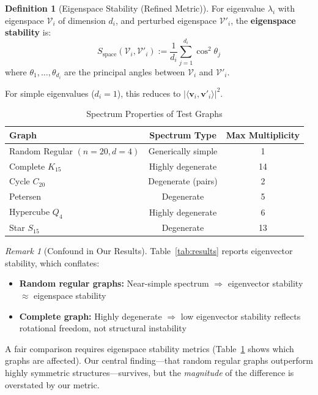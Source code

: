 \documentclass[11pt,a4paper]{article}
\theoremstyle{definition}
\newtheorem{definition}[theorem]{Definition}
\theoremstyle{remark}
\newtheorem{remark}[theorem]{Remark}
\newcommand{\inner}[2]{\langle #1, #2 \rangle}
\begin{document}
\begin{definition}[Eigenspace Stability (Refined Metric)]
For eigenvalue $\lambda_i$ with eigenspace $\mathcal{V}_i$ of dimension $d_i$, and perturbed eigenspace $\mathcal{V}'_i$, the \textbf{eigenspace stability} is:
\[
S_{\text{space}}(\mathcal{V}_i, \mathcal{V}'_i) := \frac{1}{d_i} \sum_{j=1}^{d_i} \cos^2 \theta_j
\]
where $\theta_1, \ldots, \theta_{d_i}$ are the principal angles between $\mathcal{V}_i$ and $\mathcal{V}'_i$.

For simple eigenvalues ($d_i = 1$), this reduces to $|\inner{\mathbf{v}_i}{\mathbf{v}'_i}|^2$.
\end{definition}

\begin{table}[h]
\centering
\caption{Spectrum Properties of Test Graphs}
\label{tab:spectrum}
\begin{tabular}{lcc}
\toprule
\textbf{Graph} & \textbf{Spectrum Type} & \textbf{Max Multiplicity} \\
\midrule
Random Regular $(n{=}20, d{=}4)$ & Generically simple & 1 \\
Complete $K_{15}$ & Highly degenerate & 14 \\
Cycle $C_{20}$ & Degenerate (pairs) & 2 \\
Petersen & Degenerate & 5 \\
Hypercube $Q_4$ & Highly degenerate & 6 \\
Star $S_{15}$ & Degenerate & 13 \\
\bottomrule
\end{tabular}
\end{table}

\begin{remark}[Confound in Our Results]
Table~\ref{tab:results} reports eigenvector stability, which conflates:
\begin{itemize}
    \item \textbf{Random regular graphs:} Near-simple spectrum $\Rightarrow$ eigenvector stability $\approx$ eigenspace stability
    \item \textbf{Complete graph:} Highly degenerate $\Rightarrow$ low eigenvector stability reflects rotational freedom, not structural instability
\end{itemize}
A fair comparison requires eigenspace stability metrics (Table~\ref{tab:spectrum} shows which graphs are affected). Our central finding---that random regular graphs outperform highly symmetric structures---survives, but the \emph{magnitude} of the difference is overstated by our metric.
\end{remark}
\end{document}
